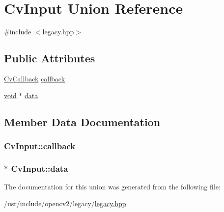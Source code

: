 \hypertarget{unionCvInput}{\section{Cv\-Input Union Reference}
\label{unionCvInput}
}


{\ttfamily \#include $<$legacy.\-hpp$>$}

\subsection*{Public Attributes}
\begin{DoxyCompactItemize}
\item 
\hyperlink{legacy_8hpp_acc546d7b88e7ae69cf9d9cbb750f8ac1}{Cv\-Callback} \hyperlink{unionCvInput_af3dddd9cf5bd893640a9fea1d34cca90}{callback}
\item 
\hyperlink{legacy_8hpp_a8bb47f092d473522721002c86c13b94e}{void} $\ast$ \hyperlink{unionCvInput_af02370c1290daef253984f0c466d0ab7}{data}
\end{DoxyCompactItemize}


\subsection{Member Data Documentation}
\hypertarget{unionCvInput_af3dddd9cf5bd893640a9fea1d34cca90}{
\subsubsection[{callback}]{ Cv\-Input\-::callback}}\label{unionCvInput_af3dddd9cf5bd893640a9fea1d34cca90}
\hypertarget{unionCvInput_af02370c1290daef253984f0c466d0ab7}{
\subsubsection[{data}]{$\ast$ Cv\-Input\-::data}}\label{unionCvInput_af02370c1290daef253984f0c466d0ab7}


The documentation for this union was generated from the following file\-:\begin{DoxyCompactItemize}
\item 
/usr/include/opencv2/legacy/\hyperlink{legacy_8hpp}{legacy.\-hpp}\end{DoxyCompactItemize}
